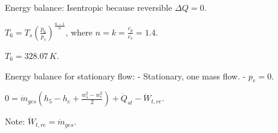 Energy balance:  
Isentropic because reversible \( \Delta Q = 0 \).  

\( T_6 = T_s \left( \frac{p_6}{p_s} \right)^{\frac{n-1}{n}} \),  
where \( n = k = \frac{c_p}{c_v} = 1.4 \).  

\( T_6 = 328.07 \, K \).  

Energy balance for stationary flow:  
- Stationary, one mass flow.  
- \( p_e = 0 \).  

\( 0 = \dot{m}_{ges} \left( h_5 - h_e + \frac{w_5^2 - w_e^2}{2} \right) + \dot{Q}_{st} - \dot{W}_{t,re} \).  

Note: \( \dot{W}_{t,re} = \dot{m}_{ges} \).